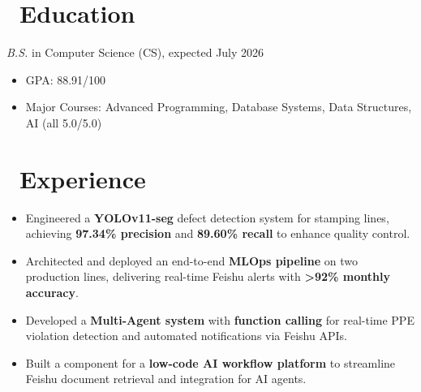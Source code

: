 \documentclass{resume}
\begin{document}



\section{\faGraduationCap\ Education}
\textit{B.S.} in Computer Science (CS), expected July 2026
\begin{itemize}
  \item GPA: 88.91/100
  \item Major Courses: Advanced Programming, Database Systems, Data Structures, AI (all 5.0/5.0)
\end{itemize}

\section{\faUsers\ Experience}

\begin{itemize}
    \item Engineered a \textbf{YOLOv11-seg} defect detection system for stamping lines, achieving \textbf{97.34\% precision} and \textbf{89.60\% recall} to enhance quality control.
    \item Architected and deployed an end-to-end \textbf{MLOps pipeline} on two production lines, delivering real-time Feishu alerts with \textbf{>92\% monthly accuracy}.
    \item Developed a \textbf{Multi-Agent system} with \textbf{function calling} for real-time PPE violation detection and automated notifications via Feishu APIs.
    \item Built a component for a \textbf{low-code AI workflow platform} to streamline Feishu document retrieval and integration for AI agents.
\end{itemize}
\end{document}
